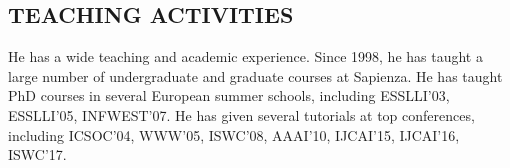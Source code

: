 \subsection*{TEACHING ACTIVITIES}
\vspace{-1ex}
He has a wide teaching and academic experience. Since 1998, he has taught a large number of undergraduate and graduate courses at Sapienza.  
He has taught PhD courses in several European summer schools, including 
ESSLLI'03, %
ESSLLI'05, %
INFWEST'07. %
He has given several tutorials at top conferences, including 
ICSOC'04,
WWW'05, %
ISWC'08, %
AAAI'10, %
IJCAI'15, %
IJCAI'16, %
ISWC'17.


